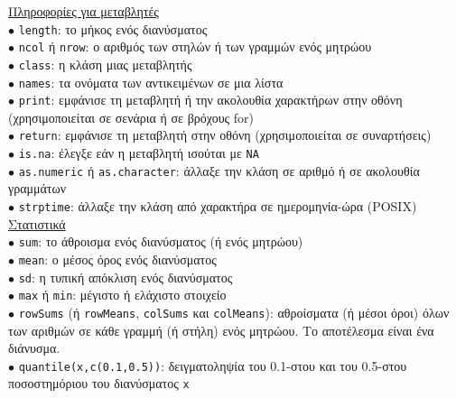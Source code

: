 \documentclass[a4paper,10pt,twocolumn]{article}
\begin{document}
\noindent \underline{Πληροφορίες για μεταβλητές}\vspace{0.2cm}\\
$\bullet$ \texttt{length}: το μήκος ενός διανύσματος\\
$\bullet$ \texttt{ncol} ή \texttt{nrow}: ο αριθμός των στηλών ή των γραμμών ενός μητρώου\\
$\bullet$ \texttt{class}: η κλάση μιας μεταβλητής \\
$\bullet$ \texttt{names}: τα ονόματα των αντικειμένων σε μια λίστα \\
$\bullet$ \texttt{print}: εμφάνισε τη μεταβλητή ή την ακολουθία χαρακτήρων στην οθόνη (χρησιμοποιείται σε
σενάρια ή σε βρόχους for) \\
$\bullet$ \texttt{return}: εμφάνισε τη μεταβλητή στην οθόνη (χρησιμοποιείται σε συναρτήσεις) \\
$\bullet$ \texttt{is.na}: έλεγξε εάν η μεταβλητή ισούται με \texttt{NA}\\
$\bullet$ \texttt{as.numeric} ή \texttt{as.character}: άλλαξε την κλάση σε αριθμό ή σε ακολουθία γραμμάτων\\
$\bullet$ \texttt{strptime}: άλλαξε την κλάση από χαρακτήρα σε ημερομηνία-ώρα (POSIX)\\

\noindent \underline{Στατιστικά}\vspace{0.2cm}\\
$\bullet$ \texttt{sum}: το άθροισμα ενός διανύσματος (ή ενός μητρώου)\\
$\bullet$ \texttt{mean}: ο μέσος όρος ενός διανύσματος\\
$\bullet$ \texttt{sd}: η τυπική απόκλιση ενός διανύσματος\\
$\bullet$ \texttt{max} ή \texttt{min}: μέγιστο ή ελάχιστο στοιχείο\\
$\bullet$ \texttt{rowSums} (ή \texttt{rowMeans}, \texttt{colSums} και \texttt{colMeans}): 
αθροίσματα (ή μέσοι όροι) όλων των αριθμών σε κάθε γραμμή (ή στήλη) ενός μητρώου. Το αποτέλεσμα είναι ένα
διάνυσμα.\\
$\bullet$ \texttt{quantile(x,c(0.1,0.5))}: δειγματοληψία του 0.1-στου και του 0.5-στου ποσοστημόριου του
διανύσματος \texttt{x}\\
\end{document}
